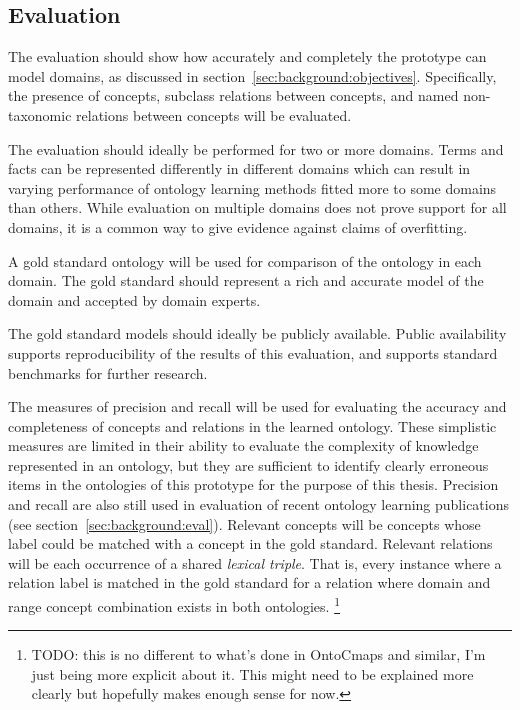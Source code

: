 \documentclass[a4paper]{report}
\newcommand{\todo}[1]{\footnote{{\color{red} TODO: #1}}}
\begin{document}
\subsection{Evaluation}
\label{sec:methods:evaluation}

The evaluation should show how accurately and completely the prototype can model domains, as discussed in section~\ref{sec:background:objectives}.
Specifically, the presence of concepts, subclass relations between concepts, and named non-taxonomic relations between concepts will be evaluated.

The evaluation should ideally be performed for two or more domains.
Terms and facts can be represented differently in different domains which can result in varying performance of ontology learning methods fitted more to some domains than others.
While evaluation on multiple domains does not prove support for all domains, it is a common way to give evidence against claims of overfitting.

A gold standard ontology will be used for comparison of the ontology in each domain.
The gold standard should represent a rich and accurate model of the domain and accepted by domain experts.

The gold standard models should ideally be publicly available.
Public availability supports reproducibility of the results of this evaluation, and supports standard benchmarks for further research.

The measures of precision and recall will be used for evaluating the accuracy and completeness of concepts and relations in the learned ontology.
These simplistic measures are limited in their ability to evaluate the complexity of knowledge represented in an ontology, but they are sufficient to identify clearly erroneous items in the ontologies of this prototype for the purpose of this thesis.
Precision and recall are also still used in evaluation of recent ontology learning publications (see section~\ref{sec:background:eval}).
Relevant concepts will be concepts whose label could be matched with a concept in the gold standard.
Relevant relations will be each occurrence of a shared \emph{lexical triple}.
That is, every instance where a relation label is matched in the gold standard for a relation where domain and range concept combination exists in both ontologies.
\todo{this is no different to what's done in OntoCmaps and similar, I'm just being more explicit about it.
This might need to be explained more clearly but hopefully makes enough sense for now.}
\end{document}

